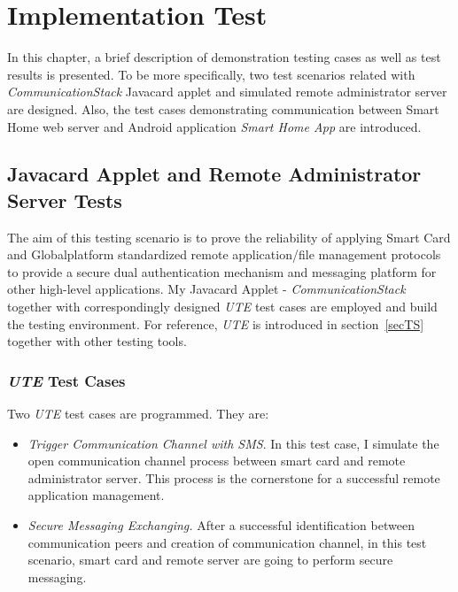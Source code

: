 \chapter{Implementation Test} \label{secImpl}
In this chapter, a brief description of demonstration testing cases as well as test results is presented. To be more specifically, two test scenarios related with \emph{CommunicationStack} Javacard applet and simulated remote administrator server are designed. Also, the test cases demonstrating communication between Smart Home web server and Android application \emph{Smart Home App} are introduced.

\section{Javacard Applet and Remote Administrator Server Tests}
The aim of this testing scenario is to prove the reliability of applying Smart Card and Globalplatform standardized remote application/file management protocols to provide a secure dual authentication mechanism and messaging platform for other high-level applications. My Javacard Applet - \emph{CommunicationStack} together with correspondingly designed \emph{UTE} test cases are employed and build the testing environment. For reference, \emph{UTE} is introduced in section~\ref{secTS} together with other testing tools.

\subsection{\emph{UTE} Test Cases}

Two \emph{UTE} test cases are programmed. They are:
\begin{itemize}
\item \emph{Trigger Communication Channel with SMS}. In this test case, I simulate the open communication channel process between smart card and remote administrator server. This process is the cornerstone for a successful remote application management.
\item \emph{Secure Messaging Exchanging.} After a successful identification between communication peers and creation of communication channel, in this test scenario, smart card and remote server are going to perform secure messaging. 
\end{itemize}

